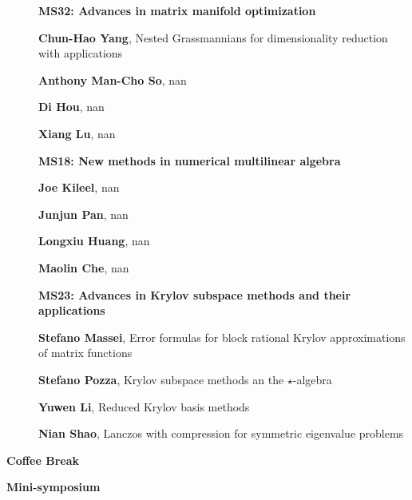 \documentclass[ILAS2025-program.tex]{subfiles}
\begin{document}
\begin{description}
    \begin{description}
    \item[] {\color{mstitle}\textbf{MS32: Advances in matrix manifold optimization}} 
    \item[] \textbf{Chun-Hao Yang}, Nested Grassmannians for dimensionality reduction with applications
        \item[] \textbf{Anthony Man-Cho So}, nan
        \item[] \textbf{Di Hou}, nan
        \item[] \textbf{Xiang Lu}, nan
        \end{description}
    \begin{description}
    \item[] {\color{mstitle}\textbf{MS18: New methods in numerical multilinear algebra}} 
    \item[] \textbf{Joe Kileel}, nan
        \item[] \textbf{Junjun Pan}, nan
        \item[] \textbf{Longxiu Huang}, nan
        \item[] \textbf{Maolin Che}, nan
        \end{description}
    \begin{description}
    \item[] {\color{mstitle}\textbf{MS23: Advances in Krylov subspace methods and their applications}} 
    \item[] \textbf{Stefano Massei}, Error formulas for block rational Krylov approximations of matrix functions
        \item[] \textbf{Stefano Pozza}, Krylov subspace methods an the $\star$-algebra
        \item[] \textbf{Yuwen Li}, Reduced Krylov basis methods
        \item[] \textbf{Nian Shao}, Lanczos with compression for symmetric eigenvalue problems
        \end{description}
    \item[\info{15:30\textrm{--}16:00}] \textbf{Coffee Break} 
    \item[\info{16:00\textrm{--}18:00}] \textbf{Mini-symposium} 

\end{description}
\end{document}
